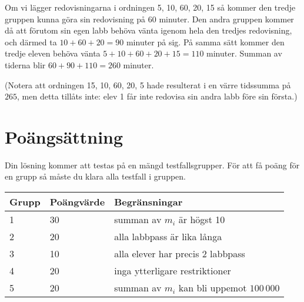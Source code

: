 Om vi lägger redovisningarna i ordningen 5, 10, 60, 20, 15 så kommer den tredje gruppen kunna göra sin redovisning på 60 minuter.
Den andra gruppen kommer då att förutom sin egen labb behöva vänta igenom hela den tredjes redovisning, och därmed ta $10+60+20 = 90$ minuter på sig.
På samma sätt kommer den tredje eleven behöva vänta $5+10+60+20+15 = 110$ minuter.
Summan av tiderna blir $60 + 90 + 110 = 260$ minuter.

(Notera att ordningen 15, 10, 60, 20, 5 hade resulterat i en värre tidssumma på $265$, men detta tillåts inte: elev 1 får inte redovisa sin andra labb före sin första.)

\section*{Poängsättning}
Din lösning kommer att testas på en mängd testfallsgrupper. För att få poäng för en grupp så måste du klara alla testfall i gruppen.

\begin{tabular}{| l | l | l |}
	\hline
	Grupp & Poängvärde & Begränsningar\\ \hline
  1     & 30         & summan av $m_i$ är högst 10 \\ \hline
  2     & 20         & alla labbpass är lika långa \\ \hline
  3     & 10         & alla elever har precis 2 labbpass \\ \hline
  4     & 20         & inga ytterligare restriktioner \\ \hline
  5     & 20         & summan av $m_i$ kan bli uppemot $100\,000$ \\ \hline
\end{tabular}
